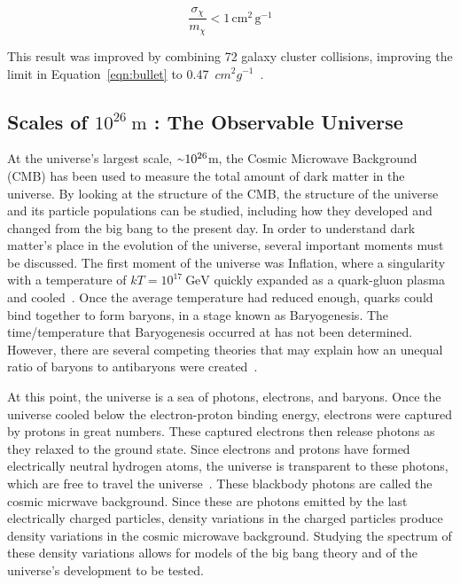     \begin{equation}\label{eqn:bullet}
      \frac{\sigma_{\chi}}{m_{\chi}} < 1 \, \textrm{cm}^2 \, \textrm{g}^{-1}
    \end{equation}
    
    This result was improved by combining 72 galaxy cluster collisions, improving the limit in Equation~\ref{eqn:bullet} to \SI{0.47}{$cm^{2} g^{-1}$}~\cite{cluster_72}.


  \subsection{Scales of $10^{26}\:\text{m}$ : The Observable Universe}\label{dm_universe}
    At the universe's largest scale, $\nicetilde 10^{26}$m, the Cosmic Microwave Background (CMB) has been used to measure the total amount of dark matter in the universe.
    By looking at the structure of the CMB, the structure of the universe and its particle populations can be studied, including how they developed and changed from the big bang to the present day.
    In order to understand dark matter's place in the evolution of the universe, several important moments must be discussed.
    The first moment of the universe was Inflation, where a singularity with a temperature of $kT=10^{17}\:\textrm{GeV}$ quickly expanded as a quark-gluon plasma and cooled~\cite{inflation0,inflation1,inflation2,inflation3}.
    Once the average temperature had reduced enough, quarks could bind together to form baryons, in a stage known as Baryogenesis.
    The time/temperature that Baryogenesis occurred at has not been determined.
    However, there are several competing theories that may explain how an unequal ratio of baryons to antibaryons were created~\cite{baryogenesis1,baryogenesis2}.
    
    At this point, the universe is a sea of photons, electrons, and baryons.
    Once the universe cooled below the electron-proton binding energy, electrons were captured by protons in great numbers.
    These captured electrons then release photons as they relaxed to the ground state.
    Since electrons and protons have formed electrically neutral hydrogen atoms, the universe is transparent to these photons, which are free to travel the universe~\cite{planck2015,theEarlyUniverse,CMBFundamentals,CMBFlat}.
    These blackbody photons are called the cosmic micrwave background.
    Since these are photons emitted by the last electrically charged particles, density variations in the charged particles produce density variations in the cosmic microwave background.
    Studying the spectrum of these density variations allows for models of the big bang theory and of the universe's development to be tested.
    
